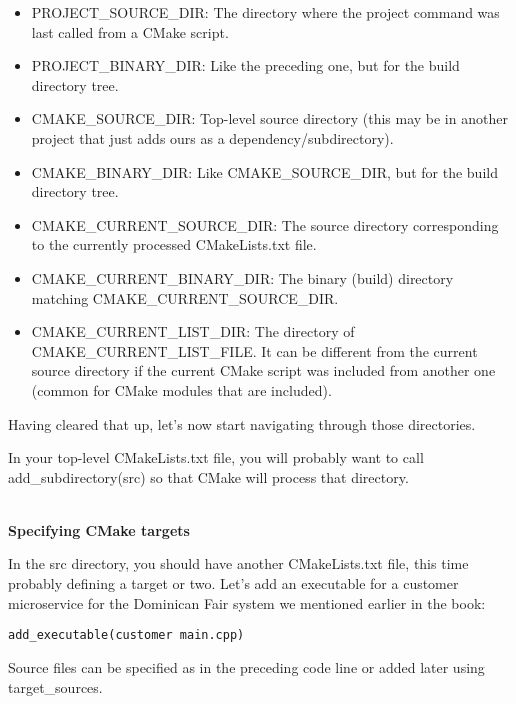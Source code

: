 \begin{itemize}
\item 
PROJECT\_SOURCE\_DIR: The directory where the project command was last called from a CMake script.

\item 
PROJECT\_BINARY\_DIR: Like the preceding one, but for the build directory tree.

\item 
CMAKE\_SOURCE\_DIR: Top-level source directory (this may be in another project that just adds ours as a dependency/subdirectory).

\item 
CMAKE\_BINARY\_DIR: Like CMAKE\_SOURCE\_DIR, but for the build directory tree.

\item 
CMAKE\_CURRENT\_SOURCE\_DIR: The source directory corresponding to the currently processed CMakeLists.txt file.

\item 
CMAKE\_CURRENT\_BINARY\_DIR: The binary (build) directory
matching CMAKE\_CURRENT\_SOURCE\_DIR.

\item 
CMAKE\_CURRENT\_LIST\_DIR: The directory of CMAKE\_CURRENT\_LIST\_FILE. It can be different from the current source directory if the current CMake script was included from another one (common for CMake modules that are included).
\end{itemize}

Having cleared that up, let's now start navigating through those directories.

In your top-level CMakeLists.txt file, you will probably want to call add\_subdirectory(src) so that CMake will process that directory.

\hspace*{\fill} \\ %
\noindent
\textbf{Specifying CMake targets}

In the src directory, you should have another CMakeLists.txt file, this time probably defining a target or two. Let's add an executable for a customer microservice for the Dominican Fair system we mentioned earlier in the book:

\begin{lstlisting}[style=styleCMake]
add_executable(customer main.cpp)
\end{lstlisting}

Source files can be specified as in the preceding code line or added later using target\_sources.

